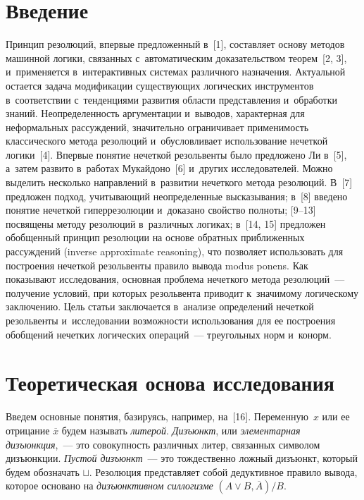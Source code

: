\thispagestyle{headings}

\begin{multicols}{2}

\label{st\stat}

\section{Введение}

  Принцип резолюций, впервые предложенный в~[1], составляет основу 
методов машинной логики, связанных с~автоматическим доказательством 
теорем~[2, 3], и~применяется в~интерактивных системах различного назначения. 
Актуальной остается задача модификации существующих логических 
инструментов в~соответствии с~тенденциями развития области представления 
и~обработки знаний. Неопределенность аргументации и~выводов, характерная для 
неформальных рассуждений, значительно ограничивает применимость 
классического метода резолюций и~обусловливает использование нечеткой 
логики~[4]. Впервые понятие нечеткой резольвенты было предложено Ли в~[5], 
а~затем развито в~работах Мукайдоно~[6] и~других исследователей. Можно 
выделить несколько направлений в~развитии нечеткого метода резолюций. 
В~[7] предложен подход, учитывающий неопределенные высказывания; в~[8] 
введено понятие нечеткой гиперрезолюции и~доказано свойство полноты;  
[9--13] посвящены методу резолюций в~различных логиках; в~[14, 15] 
предложен обобщенный принцип резолюции на основе обратных 
приближенных рассуждений (inverse approximate reasoning), что позволяет 
использовать для построения нечеткой резольвенты правило вывода modus 
ponens. Как показывают исследования, основная проблема нечеткого метода 
резолюций~--- получение условий, при которых резольвента приводит 
к~значимому логическому заключению. Цель статьи заключается в~анализе 
определений нечеткой резольвенты и~исследовании возможности 
использования для ее по\-стро\-ения обобщений нечетких логических операций~--- 
треугольных норм и~конорм.
  

\section{Теоретическая основа исследования}

  Введем основные понятия, базируясь, например, на~[16]. Переменную~$x$ 
или ее отрицание $\overline{x}$ будем называть \textit{литерой}. 
\textit{Дизъюнкт}, или \textit{элементарная дизъюнкция},~--- это совокупность 
различных литер, связанных символом дизъюнкции. \textit{Пустой 
дизъюнкт}~--- это тождественно ложный дизъюнкт, который будем обозначать 
$\sqcup$. Резолюция представляет собой дедуктивное правило вывода, которое 
основано на \textit{дизъюнктивном силлогизме} $(A\vee B, \overline{A})/B$.
  

\end{multicols}
